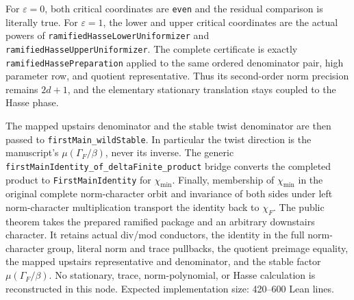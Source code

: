 \begin{theorem}
For $\varepsilon=0$, both critical coordinates are \texttt{even} and the
residual comparison is literally true.  For $\varepsilon=1$, the lower and
upper critical coordinates are the actual powers of
\texttt{ramifiedHasseLowerUniformizer} and
\texttt{ramifiedHasseUpperUniformizer}.  The complete certificate is exactly
\texttt{ramifiedHassePreparation} applied to the same ordered denominator
pair, high parameter row, and quotient representative.  Thus its
second-order norm precision remains $2d+1$, and the elementary stationary
translation stays coupled to the Hasse phase.

The mapped upstairs denominator and the stable twist denominator are then
passed to \texttt{firstMain\_wildStable}.  In particular the twist direction
is the manuscript's $\mu(\Gamma_F/\beta)$, never its inverse.  The generic
\texttt{firstMainIdentity\_of\_deltaFinite\_product} bridge converts the
completed product to \texttt{FirstMainIdentity} for $\chi_{\min}$.  Finally,
membership of $\chi_{\min}$ in the original complete norm-character orbit
and invariance of both sides under left norm-character multiplication
transport the identity back to $\chi_F$.
\leanok
{}
\FormalizationContract
The public theorem takes the prepared ramified package and an arbitrary
downstairs character.  It retains actual div/mod conductors, the identity in
the full norm-character group, literal norm and trace pullbacks, the quotient
preimage equality, the mapped upstairs representative and denominator, and
the stable factor $\mu(\Gamma_F/\beta)$.  No stationary, trace, norm-polynomial,
or Hasse calculation is reconstructed in this node.  Expected implementation
size: 420--600 Lean lines.
\end{theorem}
